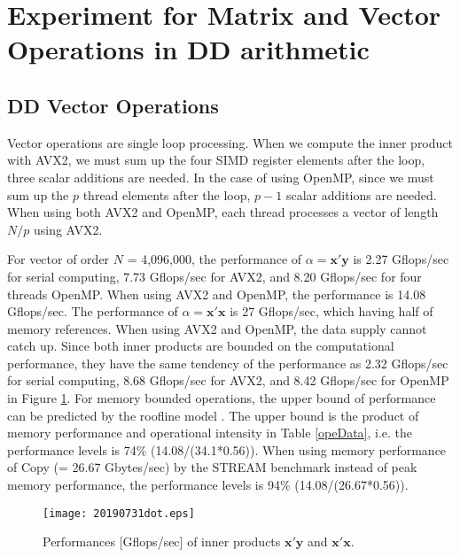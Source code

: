 \documentclass{IOS-Book-Article}
\begin{document}
\section{Experiment for Matrix and Vector Operations in DD arithmetic}
\subsection{DD Vector Operations}
Vector operations are single loop processing. 
When we compute the inner product with AVX2, we must sum up the four SIMD register elements after the loop, three scalar additions are needed.
In the case of using OpenMP, since we must sum up the $p$ thread elements after the loop, $p-1$ scalar additions are needed.
When using both AVX2 and OpenMP, each thread processes a vector of length $N/p$ using AVX2.

For vector of order $N$ = 4,096,000, the performance of $\alpha  = \bm{x}'\bm{y}$ is 2.27 Gflops/sec for serial computing, 7.73 Gflops/sec for AVX2, and 8.20 Gflops/sec for four threads OpenMP. When using AVX2 and OpenMP, the performance is 14.08 Gflops/sec.
The performance of $\alpha = \bm{x}'\bm{x}$ is 27 Gflops/sec, which having half of memory references. 
When using AVX2 and OpenMP, the data supply cannot catch up. 
Since both inner products are bounded on the computational performance, they have the same tendency of the performance as 2.32 Gflops/sec for serial computing, 8.68 Gflops/sec for AVX2, and 8.42 Gflops/sec for OpenMP in Figure \ref{xdot}.
For memory bounded operations, the upper bound of performance can be predicted by the roofline model \cite{roof}. The upper bound is the product of memory performance and operational intensity in Table \ref{opeData}, i.e. the performance levels is 74\% (14.08/(34.1*0.56)). When using memory performance of Copy (= 26.67 Gbytes/sec) by the STREAM benchmark instead of peak memory performance, the performance levels is 94\% (14.08/(26.67*0.56)).

\begin{figure}[htbp]
  \begin{center}
    \texttt{[image: 20190731dot.eps]}
    \caption{Performances [Gflops/sec] of inner products $\bm{x}'\bm{y}$ and $\bm{x}'\bm{x}$.}
    \label{xdot}
  \end{center}
\end{figure}
\end{document}
